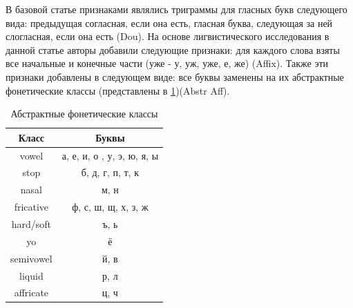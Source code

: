 \documentclass[14pt, a4paper, russian]{extreport}
\begin{document}
В базовой статье \cite{dou} признаками являлись триграммы для гласных букв следующего вида: предыдущая согласная, если она есть, гласная буква, следующая за ней слогласная, если она есть (Dou). На основе лигвистического исследования в данной статье авторы добавили следующие признаки: для каждого слова взяты все начальные и конечные части (уже - у, уж, уже, е, же) (Affix). Также эти признаки добавлены в следующем виде: все буквы заменены на их абстрактные фонетические классы (представлены в \cref{table:phon_class})({Abstr Aff}).
\begin{table}[H]
		\caption{ Абстрактные фонетические классы}
	
	\begin{small}
		\begin{center}
			\begin{tabular}{|c|c|}
				\hline
				  Класс   &           Буквы            \\ \hline
				  vowel   & а, е, и, о , у, э, ю, я, ы \\ \hline
				  stop    &      б, д, г, п, т, к      \\ \hline
				  nasal   &            м, н            \\ \hline
				fricative &    ф, с, ш, щ, х, з, ж     \\ \hline
				hard/soft &            ъ, ь            \\ \hline
				   yo     &             ё              \\ \hline
				semivowel &            й, в            \\ \hline
				 liquid   &            р, л            \\ \hline
				affricate &            ц, ч            \\ \hline
			\end{tabular}
		\end{center}
	\end{small}
	\label{table:phon_class}
\end{table}
\end{document}
